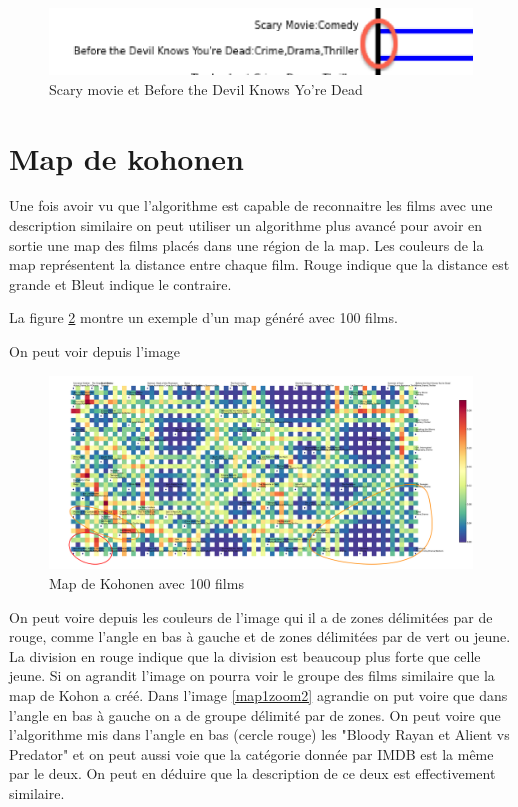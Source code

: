 		\begin{figure}[h]
			  \centering
			    \includegraphics[width=0.6\linewidth]{img/scarymovie.png}
			  \caption{Scary movie et Before the Devil Knows Yo're Dead}
			  \label{scarymovie}
			\end{figure}



	
	\section{Map de kohonen}
	Une fois avoir vu que l'algorithme est capable de reconnaitre les films avec une description similaire on peut utiliser un algorithme plus avancé pour avoir en sortie une map des films placés dans une région de la map. Les couleurs de la map représentent la distance entre chaque film. Rouge indique que la distance est grande et Bleut indique le contraire.
	
	La figure \ref{map1} montre un exemple d'un map généré avec 100 films.
	
	On peut voir depuis l'image
	\begin{figure}[h]
		\centering
		\includegraphics[width=1\linewidth]{img/map-cluster.png}
		\caption{Map de Kohonen avec 100 films}
		\label{map1}
	\end{figure}
	
	On peut voire depuis les couleurs de l'image qui il a de zones délimitées par de rouge, comme l'angle en bas à gauche et de zones délimitées par de vert ou jeune. La division en rouge indique que la division est beaucoup plus forte que celle jeune. Si on agrandit l'image on pourra voir le groupe des films similaire que la map de Kohon a créé.
	Dans l'image \ref{map1zoom2} agrandie on put voire que dans l'angle en bas à gauche on a de groupe délimité par de zones. On peut voire que l'algorithme mis dans l'angle en bas (cercle rouge) les "Bloody Rayan et Alient vs Predator" et on peut aussi voie que la catégorie donnée par IMDB est la même par le deux. On peut en déduire que la description de ce deux est effectivement similaire.
	
